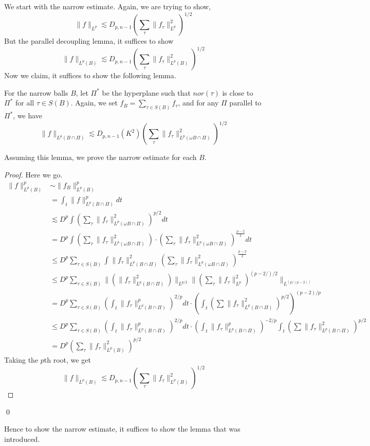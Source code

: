 We start with the narrow estimate.
Again, we are trying to show,
\begin{equation*}
    \|f\|_{L^p}\lesssim D_{p,n-1}\left(\sum_\tau\|f_\tau\|_{L^p}^2 \right)^{1/2}
\end{equation*}
But the parallel decoupling lemma, it suffices to show
\begin{equation*}
    \|f\|_{L^p(B)}\lesssim D_{p,n-1}\left(\sum_\tau\|f_\tau\|_{L^p(B)}^2 \right)^{1/2}
\end{equation*}
Now we claim, it suffices to show the following lemma.
\begin{lemma}
    For the narrow balls $B$, let $\Pi^*$ be the hyperplane such that $nor(\tau)$ is close to $\Pi^*$ for all $\tau\in S(B)$. Again, we set $f_B=\sum_{\tau\in S(B)}f_\tau$, and for any $\Pi$ parallel to $\Pi^*$, we have
    \begin{equation*}
        \|f\|_{L^p(B\cap\Pi)}\lesssim D_{p,n-1}(K^2)\left(\sum_\tau\|f_\tau\|_{L^p(\omega B\cap\Pi)}^2 \right)^{1/2}
    \end{equation*}
\end{lemma}
Assuming this lemma, we prove the narrow estimate for each $B$.
\begin{proof}
Here we go.
\begin{align*}
    \|f\|_{L^p(B)}^p&\sim\|f_B\|_{L^p(B)}^p\\
    &=\int_t\|f\|_{L^p(B\cap\Pi)}^pdt\\
    &\lesssim D^p\int\left(\sum_\tau\|f_\tau\|_{L^p(\omega B\cap\Pi)}^2 \right)^{p/2}dt\\
    &=D^p\int \left(\sum_\tau\|f_\tau\|_{L^p(\omega B\cap\Pi)}^2 \right)\cdot \left(\sum_\tau\|f_\tau\|_{L^p(\omega B\cap\Pi)}^2\right)^{\frac{p-2}{2}}dt\\
    &\leq D^p\sum_{\tau\in S(B)}\int\|f_\tau\|_{L^p(B\cap\Pi)}^2 \left(\sum_\tau\|f_\tau\|_{L^p(\omega B\cap\Pi)}^2\right)^{\frac{p-2}{2}}\\
    &\leq D^p\sum_{\tau\in S(B)}\|(\|f_\tau\|_{L^p(B\cap\Pi)}^2)\|_{L^{p/2}}\|(\sum_\tau\|f_\tau\|_{L^p}^2)^{(p-2/)/2}\|_{L^(p/(p-2))}\\
    &=D^p\sum_{\tau\in S(B)}\left(\int_t\|f_\tau\|_{L^p(B\cap\Pi)}^p\right)^{2/p} dt\cdot \left(\int_t\left(\sum\|f_\tau\|_{L^p(B\cap\Pi)}^2\right)^{p/2}\right)^{(p-2)/p}\\
    &\leq D^p\sum_{\tau\in S(B)}\left(\int_t\|f_\tau\|_{L^p(B\cap\Pi)}^p\right)^{2/p} dt\cdot \left(\int_t\|f_\tau\|_{L^p(B\cap\Pi)}^p\right)^{-2/p}\int_t\left(\sum\|f_\tau\|_{L^p(B\cap\Pi)}^2\right)^{p/2}\\
    &=D^p\left(\sum_\tau\|f_\tau\|_{L^p(B)}^2 \right)^{p/2}
\end{align*}
Taking the $p$th root, we get 
\begin{equation*}
    \|f\|_{L^p(B)}\lesssim D_{p,n-1}\left(\sum_\tau\|f_\tau\|_{L^p(B)}^2\right)^{1/2}
\end{equation*}
\end{proof}
\qed

Hence to show the narrow estimate, it suffices to show the lemma that was introduced.